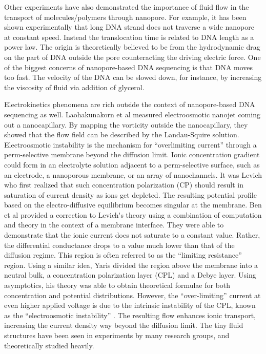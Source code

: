 Other experiments have also demonstrated the importance of fluid flow in the transport of molecules\//polymers through nanopore. For example, it has been shown experimentally that long DNA strand does not traverse a wide nanopore at constant speed\cite{storm_nanolett05}. Instead the translocation time is related to DNA length as a power law. The origin is theoretically believed to be from the hydrodynamic drag on the part of DNA outside the pore counteracting the driving electric force. One of the biggest concerns of nanopore-based DNA sequencing is that DNA moves too fast. The velocity of the DNA can be slowed down, for instance, by increasing the viscosity of fluid via addition of glycerol\cite{fologea2005slowing}. 

Electrokinetics phenomena are rich outside the context of nanopore-based DNA sequencing as well. Laohakunakorn et al\cite{ghosal2013Nanoletter} measured electroosmotic nanojet coming out a nanocapillary. By mapping the vorticity outside the nanocapillary, they showed that the flow field can be described by the Landau-Squire solution. Electroosmotic instability is the mechanism for ``overlimiting current'' through a perm-selective membrane beyond the diffusion limit. Ionic concentration gradient could form in an electrolyte solution adjacent to a perm-selective surface, such as an electrode, a nanoporous membrane, or an array of nanochannels\cite{Vlassiouk2008a}. It was Levich \cite{Levich} who first realized that such concentration polarization (CP) should result in saturation of current density as ions get depleted. The resulting potential profile based on the electro-diffusive equilibrium becomes singular at the membrane. Ben et al \cite{Ben2002} provided a correction to Levich\'{}s theory using a combination of computation and theory in the context of a membrane interface. They were able to demonstrate that the ionic current does not saturate to a constant value. Rather, the differential conductance drops to a value much lower than that of the diffusion regime. This region is often referred to as the ``limiting resistance'' region. Using a similar idea, Yaris \cite{Yariv2009} divided the region above the membrane into a neutral bulk, a concentration polarization layer (CPL) and a Debye layer. Using asymptotics, his theory was able to obtain theoretical formulae for both concentration and potential distributions. However, the ``over-limiting'' current at even higher applied voltage is due to the intrinsic instability of the CPL, known as the ``electroosmotic instability'' \cite{Rubinstein1979,rubinstein2005electroconvective,ZALTZMAN2007}. The resulting flow enhances ionic transport, increasing the current density way beyond the diffusion limit. The tiny fluid structures have been seen in experiments by many research groups, and theoretically studied heavily\cite{rubinstein2000electro,rubinstein2008direct,dydek2011overlimiting,deng2013overlimiting,chinaryan2014effect,Yossifon2008,yossifon2009nonlinear,Chang2011,kim2007concentration}. 

